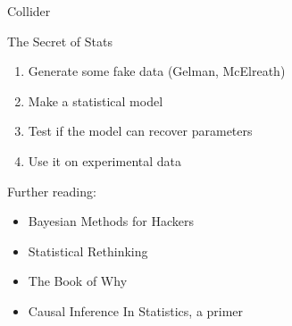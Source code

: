\documentclass[aspectratio=169,xcolor=svgnames]{beamer}
\begin{document}
\begin{frame}
\begin{center}
  \huge
  Collider

\end{center}
\end{frame}

\begin{frame}
  \begin{block}{The Secret of Stats}
    \begin{enumerate}
    \item Generate some fake data (Gelman, McElreath)
    \item Make a statistical model
    \item Test if the model can recover parameters
    \item Use it on experimental data
    \end{enumerate}
  \end{block}
\end{frame}

\begin{frame}
  Further reading:
  \begin{itemize}
  \item Bayesian Methods for Hackers
  \item Statistical Rethinking
  \item The Book of Why
  \item Causal Inference In Statistics, a primer
  \end{itemize}
\end{frame}
\end{document}
